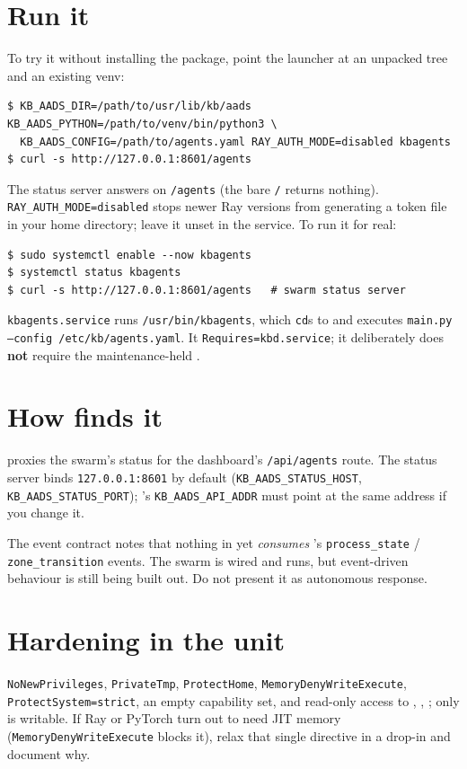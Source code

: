 \section{Run it}
To try it without installing the package, point the launcher at an unpacked tree and an existing venv:
\begin{lstlisting}[style=console]
$ KB_AADS_DIR=/path/to/usr/lib/kb/aads KB_AADS_PYTHON=/path/to/venv/bin/python3 \
  KB_AADS_CONFIG=/path/to/agents.yaml RAY_AUTH_MODE=disabled kbagents
$ curl -s http://127.0.0.1:8601/agents
\end{lstlisting}
The status server answers on \texttt{/agents} (the bare \texttt{/} returns nothing). \texttt{RAY\_AUTH\_MODE=disabled} stops newer Ray
versions from generating a token file in your home directory; leave it unset in the service.
To run it for real:
\begin{lstlisting}[style=console]
$ sudo systemctl enable --now kbagents
$ systemctl status kbagents
$ curl -s http://127.0.0.1:8601/agents   # swarm status server
\end{lstlisting}
\texttt{kbagents.service} runs \texttt{/usr/bin/kbagents}, which \texttt{cd}s to  and executes
\texttt{main.py --config /etc/kb/agents.yaml}. It \texttt{Requires=kbd.service}; it deliberately does
\textbf{not} require the maintenance-held \cmd{kb-checker}.

\section{How  finds it}
 proxies the swarm's status for the dashboard's \texttt{/api/agents} route. The status server binds
\texttt{127.0.0.1:8601} by default (\texttt{KB\_AADS\_STATUS\_HOST}, \texttt{KB\_AADS\_STATUS\_PORT}); \cmd{kbd}'s
\texttt{KB\_AADS\_API\_ADDR} must point at the same address if you change it.

\begin{kbnote}
The event contract notes that nothing in  yet \emph{consumes} 's \texttt{process\_state} /
\texttt{zone\_transition} events. The swarm is wired and runs, but event-driven behaviour is still being built
out. Do not present it as autonomous response.
\end{kbnote}

\section{Hardening in the unit}
\texttt{NoNewPrivileges}, \texttt{PrivateTmp}, \texttt{ProtectHome}, \texttt{MemoryDenyWriteExecute},
\texttt{ProtectSystem=strict}, an empty capability set, and read-only access to \file{/etc/kb}, ,
\file{/opt/kb}; only \file{/run/kb} is writable. If Ray or PyTorch turn out to need JIT memory
(\texttt{MemoryDenyWriteExecute} blocks it), relax that single directive in a drop-in and document why.
